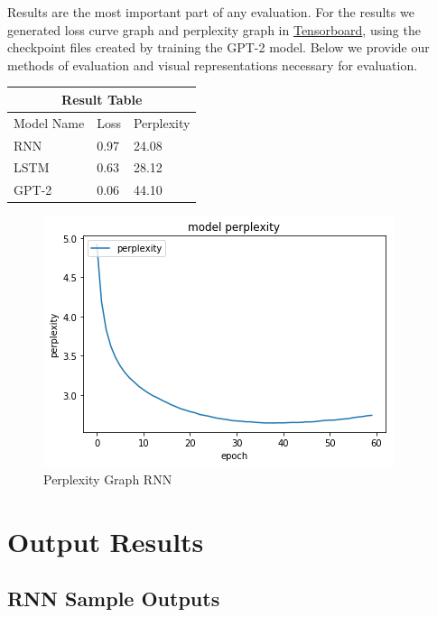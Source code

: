 \documentclass[11pt,a4paper]{article}
\begin{document}
Results are the most important part of any evaluation. For the results we generated loss curve graph and perplexity graph in \href{https://www.tensorflow.org/guide/summaries_and_tensorboard}{Tensorboard}, using the checkpoint files created by training the GPT-2 model. Below we provide our methods of evaluation and visual representations necessary for evaluation.
\newline

\begin{tabular}{ |p{2 cm}||p{1cm}|p{1.5cm}| }
 \hline
 \multicolumn{3}{|c|}{\textbf{Result Table}} \\
 \hline
    Model Name & Loss & Perplexity\\
 \hline
     RNN   &  0.97   &  24.08 \\
     LSTM  &  0.63  &   28.12 \\
     GPT-2 &  0.06   &  44.10  \\
 \hline
 
\end{tabular}


\begin{figure}[h]
\begin{center}
\includegraphics[width=1.0\linewidth]{RNNPerp.png}
\end{center}
\caption{Perplexity Graph RNN}
\end{figure}


\section{Output Results}
 
\subsection{RNN Sample Outputs}
\end{document}
